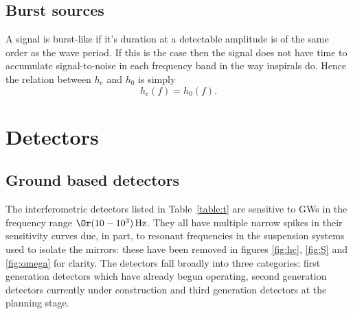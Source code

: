 \documentclass[fleqn,12pt]{iopart}
\newcommand{\sub}[1]{\ensuremath{_\mathrm{#1}}}
\begin{document}
\subsection{Burst sources}

A signal is burst-like if it's duration at a detectable amplitude is of the same order as the wave period. If this is the case then the signal does not have time to accumulate signal-to-noise in each frequency band in the way inspirals do. Hence the relation between $h\sub{c}$ and $h_{0}$ is simply
\begin{equation}\label{eq:simple}
h\sub{c}(f) = h_{0}(f).
\end{equation}

\section{Detectors}\label{sec:detectors}

\subsection{Ground based detectors}

The interferometric detectors listed in Table~\ref{table:t} are sensitive to GWs in the frequency range $\Or(10-10^{3})\,\textrm{Hz}$. They all have multiple narrow spikes in their sensitivity curves due, in part, to resonant frequencies in the suspension systems used to isolate the mirrors: these have been removed in figures \ref{fig:hc}, \ref{fig:S} and \ref{fig:omega} for clarity. The detectors fall broadly into three categories: first generation detectors which have already begun operating, second generation detectors currently under construction and third generation detectors at the planning stage. 
\end{document}
